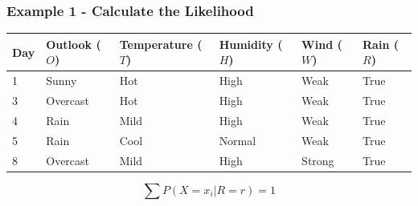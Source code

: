 \documentclass[aspectratio=169, 10pt]{beamer}
\begin{document}
\begin{frame}[t]
    \frametitle{Example 1 - Calculate the Likelihood}
    \begin{table}[]
        \small
        \begin{tabular}{l|llll|l}
        \textbf{Day} & \textbf{Outlook} ($O$) & \textbf{Temperature} ($T$) & \textbf{Humidity} ($H$) & \textbf{Wind} ($W$) & \textbf{Rain} ($R$) \\ \hline
        1            & Sunny            & Hot                  & High              & Weak          & True           \\
        3            & Overcast         & Hot                  & High              & Weak          & True           \\
        4            & Rain             & Mild                 & High              & Weak          & True           \\
        5            & Rain             & Cool                 & Normal            & Weak          & True           \\
        8            & Overcast         & Mild                 & High              & Strong        & True           \\
        \end{tabular}
    \end{table}

    $$\sum P(X=x_i| R=r) = 1$$


\end{frame}
\end{document}

